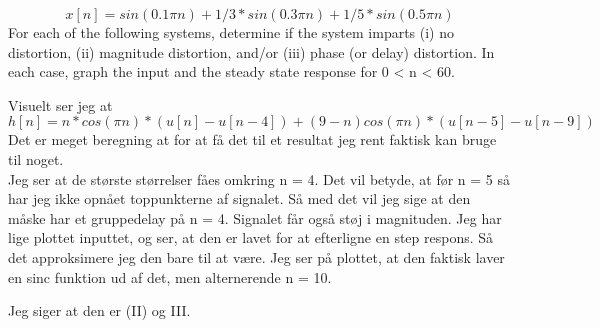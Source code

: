 \begin{Opgaver}
\begin{kapitel}
\begin{Opgave}
        \end{Opgave}
        \begin{Opgave}
            \[x[n] = sin(0.1\pi n) + 1/3 * sin(0.3\pi n) + 1/5 * sin(0.5\pi n)\]
            For each of the following systems, determine if the system imparts 
            (i) no distortion,
            (ii) magnitude distortion, and/or 
            (iii) phase (or delay) distortion. 
            In each case, graph the input and the steady state response for 0 < n < 60.
            \begin{UnderOpgave}[\text{h[n] = [1,-2,3,—4,0,4, —3,2, -1]}]
                Visuelt ser jeg at 
                \[h[n] = n*cos(\pi n)*(u[n] - u[n - 4]) + (9 - n)cos(\pi n)*(u[n - 5] - u[n - 9])\]
                Det er meget beregning at for at få det til et resultat jeg rent faktisk kan bruge til noget.\\
                Jeg ser at de største størrelser fåes omkring n = 4. Det vil betyde, at før n = 5 så har jeg ikke opnået toppunkterne af signalet. 
                Så med det vil jeg sige at den måske har et gruppedelay på n = 4. 
                Signalet får også støj i magnituden. 
                Jeg har lige plottet inputtet, og ser, at den er lavet for at efterligne en step respons. 
                Så det approksimere jeg den bare til at være.
                Jeg ser på plottet, at den faktisk laver en sinc funktion ud af det, men alternerende n = 10. 
                
                Jeg siger at den er (II) og III.
                    

\end{UnderOpgave}
\end{Opgave}
\end{kapitel}
\end{Opgaver}

